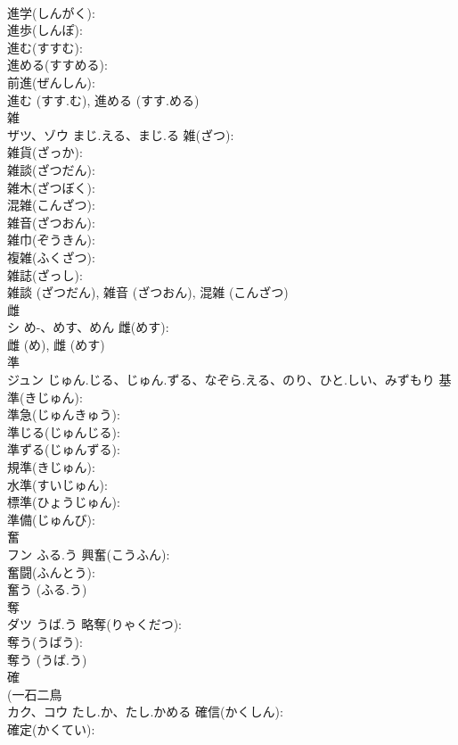 \documentclass[8pt]{extreport}
\begin{document}
\begin{CJK}{UTF8}{min}
\\	進学(しんがく): 
\\	進歩(しんぽ): 
\\	進む(すすむ): 
\\	進める(すすめる): 
\\	前進(ぜんしん): 
\\	進む (すす.む), 進める (すす.める)
\\	雑			
\\	ザツ、ゾウ	まじ.える、まじ.る	雑(ざつ): 
\\	雑貨(ざっか): 
\\	雑談(ざつだん): 
\\	雑木(ざつぼく): 
\\	混雑(こんざつ): 
\\	雑音(ざつおん): 
\\	雑巾(ぞうきん): 
\\	複雑(ふくざつ): 
\\	雑誌(ざっし): 
\\	雑談 (ざつだん), 雑音 (ざつおん), 混雑 (こんざつ)
\\	雌			
\\	シ	め-、めす、めん	雌(めす): 
\\	雌 (め), 雌 (めす)
\\	準			
\\	ジュン	じゅん.じる、じゅん.ずる、なぞら.える、のり、ひと.しい、みずもり	基準(きじゅん): 
\\	準急(じゅんきゅう): 
\\	準じる(じゅんじる): 
\\	準ずる(じゅんずる): 
\\	規準(きじゅん): 
\\	水準(すいじゅん): 
\\	標準(ひょうじゅん): 
\\	準備(じゅんび): 
\\	奮			
\\	フン	ふる.う	興奮(こうふん): 
\\	奮闘(ふんとう): 
\\	奮う (ふる.う)
\\	奪			
\\	ダツ	うば.う	略奪(りゃくだつ): 
\\	奪う(うばう): 
\\	奪う (うば.う)
\\	確			
\\	(一石二鳥 
\\	カク、コウ	たし.か、たし.かめる	確信(かくしん): 
\\	確定(かくてい): 

\end{CJK}
\end{document}
